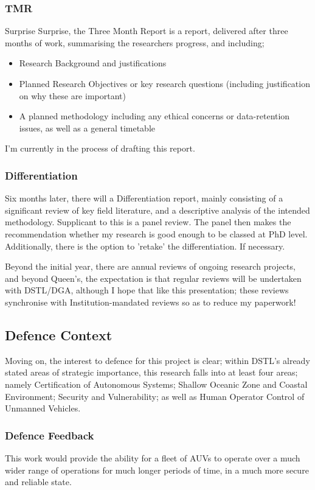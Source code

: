 \documentclass[oneside,11pt,a4paper]{Latex/Classes/PhDthesisPSnPDF}
\begin{document}
\begin{doublespace}
\subsubsection{TMR}
Surprise Surprise, the Three Month Report is a report, delivered after three
months of work, summarising the researchers progress, and including;
\begin{itemize}
  \item Research Background and justifications
  \item Planned Research Objectives or key research questions (including
  justification on why these are important)
  \item A planned methodology including any ethical concerns or data-retention
  issues, as well as a general timetable
\end{itemize}


I'm currently in the process of drafting this report.

\subsubsection{Differentiation}
Six months later, there will a Differentiation report, mainly consisting of a
significant review of key field literature, and a descriptive analysis of the
intended methodology. Supplicant to this is a panel review. The panel then makes
the recommendation whether my research is good enough to be classed at PhD
level. Additionally, there is the option to 'retake' the differentiation. If
necessary.

Beyond the initial year, there are annual reviews of ongoing research projects,
and beyond Queen's, the expectation is that regular reviews will be undertaken
with DSTL/DGA, although I hope that like this presentation; these reviews
synchronise with Institution-mandated reviews so as to reduce my paperwork!

\subsection{Defence Context}  Moving on, the interest to defence for this
project is clear; within DSTL's already stated areas of strategic importance, this research falls into
at least four areas; namely Certification of Autonomous Systems; Shallow Oceanic
Zone and Coastal Environment; Security and Vulnerability; as well as Human
Operator Control of Unmanned Vehicles.

\subsubsection{Defence Feedback}  This work would provide the ability for a
fleet of AUVs to operate over a much wider range of operations for much longer
periods of time, in a much more secure and reliable state.


\end{doublespace}
\end{document}
